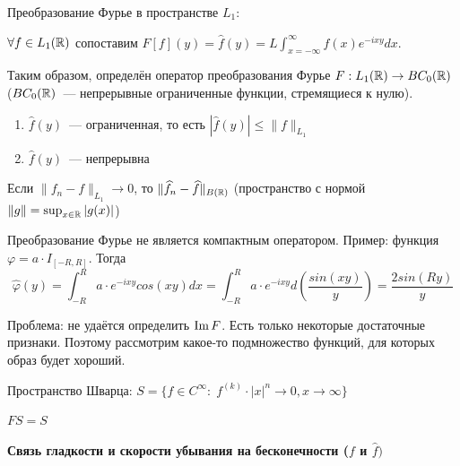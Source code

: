 \begin{definition}
    Преобразование Фурье в пространстве $L_1$:
    
    $\forall f \in L_1(\mathbb{R})$ сопоставим $F[f](y) = \widehat{f}(y) = L \int_{x = -\infty}^{\infty} f(x) e^{-ixy} dx$.

    Таким образом, определён оператор преобразования Фурье
    $F: L_1(\mathbb{R}) \to BC_0(\mathbb{R})$ ($BC_0(\mathbb{R})$~--- непрерывные ограниченные функции, стремящиеся к нулю).
\end{definition}

\begin{statement}
    \begin{enumerate}
     \item $\widehat{f}(y)$~--- ограниченная, то есть $|\widehat{f}(y)| \leqslant \|f\|_{L_1}$
     \item $\widehat{f}(y)$~--- непрерывна
    \end{enumerate}
\end{statement}

\begin{statement}
    Если $\|f_n - f\|_{L_1} \to 0$, то $\|\widehat{f}_n - \widehat{f}\|_{B(\mathbb{R})}$ (пространство с нормой $\|g\| = \sup_{x \in \mathbb{R}} |g(x)|$)
\end{statement}

\begin{example}
    Преобразование Фурье не является компактным оператором. Пример: функция $\varphi = a \cdot I_{[-R, R]}$. Тогда 
    \[
    \widehat{\varphi}(y) = 
    \int_{-R}^R a \cdot e^{-ixy} cos(xy) dx = \int_{-R}^R a \cdot e^{-ixy} d\left( \frac{sin(xy)}{y} \right) = \frac{2 sin(Ry)}{y}
    \]
\end{example}


Проблема: не удаётся определить $\operatorname{Im} F$. Есть только некоторые достаточные признаки. Поэтому рассмотрим какое-то подмножество функций, для которых образ будет хороший.

\begin{definition}
    Пространство Шварца: $S=\{f \in C^\infty : \; f^{(k)} \cdot |x|^n \to 0, x \to \infty \}$
\end{definition}

\begin{statement}[б/д]
    $FS = S$
\end{statement}

\textbf{Связь гладкости и скорости убывания на бесконечности ($f$ и $\widehat{f})$}

